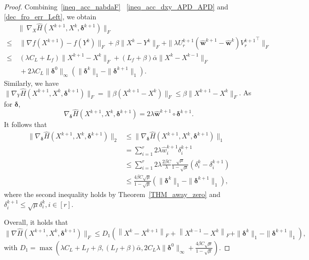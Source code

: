 \documentclass[twoside,11pt]{article}
\numberwithin{equation}{section}
\begin{document}
\begin{proof}
 
       Combining~\eqref{ineq_acc_nabdaF}
 ~\eqref{ineq_acc_dxy_APD_APD} and \eqref{dec_fro_err_Left}, we obtain 
       \begin{equation}
       \begin{aligned} 
         &  \| \ \nabla_{X} \hat{H} (X^{k+1},X^{k},\bm{\delta}^{k+1} )\|_F \\
         \le&\ \|\nabla f (X^{k+1})-f (Y^{k})\|_{F} + \beta\|X^{k}-Y^{k}\|_{F} +\|\lambda U_{r}^{k+1}  \left(\hat{\bm w}^{k+1}-\hat{\bm w}^{k}\right){V_{r}^{k+1}}^{\top}\|_{F} \\ 
         \le&\  (\lambda{C_L} +L_{f})\|X^{k+1}-X^{k}\|_{F} +  (L_{f}+\beta)\bar{\alpha}\|X^{k}-X^{k-1}\|_{F} \\
         &\ + 2\lambda{C_L}\|\bm{\delta}^{0}\|_{\infty} (\|\bm{\delta}^{k}\|_{1}-\|\bm{\delta}^{k+1}\|_{1}).      
       \end{aligned}\end{equation}
   Similarly,  we have $\|   \nabla_{Y} \hat{H} (X^{k+1},X^{k},\bm{\delta}^{k+1} ) \|_{F} = \|\beta(X^{k+1} - X^{k})\|_F \le \beta\|X^{k+1}-X^{k}\|_{F}$. 
    As for $\bm{\delta}$,  
       \begin{equation}
     \nabla_{\bm{\delta}}\hat{H} (X^{k+1},X^{k},\bm{\delta}^{k+1}) = 2\lambda \hat{\bm w}^{k+1}\circ\bm{\delta}^{k+1}. 
       \end{equation} 
  It follows that 
       \begin{equation}
         \begin{aligned} 
         \| \nabla_{\bm{\delta}}\hat{H} (X^{k+1},X^{k},\bm{\delta}^{k+1})\|_{2} &\le \| \nabla_{\bm{\delta}}\hat{H} (X^{k+1},X^{k},\bm{\delta}^{k+1})\|_{1} \\
         &= \sum\limits_{i=1}^{r} 2\lambda \hat w_{i}^{k+1} {\delta}_{i}^{k+1} \\
         &\le \sum\limits_{i=1}^{r} 2\lambda \tfrac{2\beta C}{\lambda} \tfrac{\sqrt{\mu}}{1-\sqrt{\mu}} \left(\delta_{i}^{k}-\delta_{i}^{k+1}\right) \\
         &\le \tfrac{4\beta C\sqrt{\mu}}{1-\sqrt{\mu}} \left(\|\bm{\delta}^{k}\|_{1} - \|\bm{\delta}^{k+1}\|_{1} \right),
       \end{aligned} 
       \end{equation}
       where the second inequality holds by Theorem~\ref{THM_away_zero} and $\delta_{i}^{k+1}\le \sqrt{\mu}\delta_{i}^{k}, i\in[r] $.
       
       
       Overall,    it holds that 
       \begin{equation*}\label{KLacc_K1}
         \| \nabla \hat{H} (X^{k+1},X^{k},\bm{\delta}^{k+1})\|_{F} \le D_{1}  \left(\left\|X^{k}-X^{k+1}\right\|_{F}+\left\|X^{k-1}-X^{k}\right\|_{F} + \|\bm{\delta}^{k}\|_{1}-\|\bm{\delta}^{k+1}\|_{1} \right),
       \end{equation*}
       with 
       $
         D_{1} = \max \left(\lambda{C_L} +L_{f}+ \beta, (L_f+\beta)\bar{\alpha},2C_{L}\lambda\|\bm{\delta}^{0}\|_{\infty}+\frac{4\beta C\sqrt{\mu}}{1-\sqrt{\mu}} \right).
       $
 

\end{proof}
\end{document}
